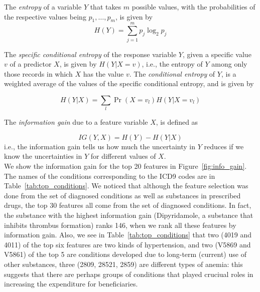 The {\em entropy} \cite{Bishop06} of a variable $Y$ that takes $m$ possible values, with the probabilities of the respective values being $p_1,{\ldots}, p_m$, is given by 
\begin{equation}
\label{eqn:entropy}
H(Y) = \sum_{j=1}^{m}p_j\log_2{p_j}
\end{equation} 

The {\em specific conditional entropy} of the response variable $Y$, given a specific value $v$ of a predictor $X$, is given by $H(Y|X = v)$, i.e., the entropy of $Y$ among only those records in which $X$ has the value $v$. The {\em conditional entropy} of $Y$, is a weighted average of the values of the specific conditional entropy, and is given by 

\begin{equation}
\label{eqn:centropy}
H(Y|X) = \sum_{l}\Pr(X = v_l)H(Y|X = v_l)
\end{equation}
 
The {\em information gain} due to a feature variable $X$, is defined as 

\begin{equation}
\label{eqn:ig}
IG(Y, X) = H(Y) - H(Y|X)
\end{equation} 
i.e., the information gain tells us how much the uncertainty in $Y$ reduces if we know the uncertainties in $Y$ for different values of $X$.\\

We show the information gain for the top 20 features in Figure~\ref{fig:info_gain}. The names of the conditions corresponding to the ICD9 codes are in Table~\ref{tab:top_conditions}. We noticed that although the feature selection was done from the set of diagnosed conditions as well as substances in prescribed drugs, the top 30 features all come from the set of diagnosed conditions. In fact, the substance with the highest information gain (Dipyridamole, a substance that inhibits thrombus formation) ranks 146, when we rank all these features by information gain. Also, we see in Table~\ref{tab:top_conditions} that two (4019 and 4011) of the top six features are two kinds of hypertension, and two (V5869 and V5861) of the top 5 are conditions developed due to long-term (current) use of other substances, three (2809, 28521, 2859) are different types of anemia: this suggests that there are perhaps groups of conditions that played cruciual roles in increasing the expenditure for beneficiaries. 

